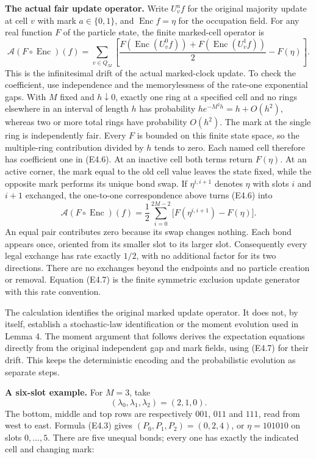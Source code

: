 \documentclass[
  11pt,
  a4paper,
]{article}
\begin{document}
\textbf{The actual fair update operator.} Write \(U_v^a f\) for the
original majority update at cell \(v\) with mark \(a\in\{0,1\}\), and
\(\operatorname{Enc}f=\eta\) for the occupation field. For any real
function \(F\) of the particle state, the finite marked-cell operator is
\[
\mathcal A(F\circ\operatorname{Enc})(f)
=\sum_{v\in Q_M}\left[
\frac{F(\operatorname{Enc}(U_v^0 f))+F(\operatorname{Enc}(U_v^1 f))}{2}
-F(\eta)\right].
\tag{E4.6}
\] This is the infinitesimal drift of the actual marked-clock update. To
check the coefficient, use independence and the memorylessness of the
rate-one exponential gaps. With \(M\) fixed and \(h\downarrow0\),
exactly one ring at a specified cell and no rings elsewhere in an
interval of length \(h\) has probability \(he^{-M^2h}=h+O(h^2)\),
whereas two or more total rings have probability \(O(h^2)\). The mark at
the single ring is independently fair. Every \(F\) is bounded on this
finite state space, so the multiple-ring contribution divided by \(h\)
tends to zero. Each named cell therefore has coefficient one in (E4.6).
At an inactive cell both terms return \(F(\eta)\). At an active corner,
the mark equal to the old cell value leaves the state fixed, while the
opposite mark performs its unique bond swap. If \(\eta^{i,i+1}\) denotes
\(\eta\) with slots \(i\) and \(i+1\) exchanged, the one-to-one
correspondence above turns (E4.6) into \[
\boxed{\quad
\mathcal A(F\circ\operatorname{Enc})(f)
=\frac12\sum_{i=0}^{2M-2}
\bigl[F(\eta^{i,i+1})-F(\eta)\bigr].\quad}
\tag{E4.7}
\] An equal pair contributes zero because its swap changes nothing. Each
bond appears once, oriented from its smaller slot to its larger slot.
Consequently every legal exchange has rate exactly \(1/2\), with no
additional factor for its two directions. There are no exchanges beyond
the endpoints and no particle creation or removal. Equation (E4.7) is
the finite symmetric exclusion update generator with this rate
convention.

The calculation identifies the original marked update operator. It does
not, by itself, establish a stochastic-law identification or the moment
evolution used in Lemma 4. The moment argument that follows derives the
expectation equations directly from the original independent gap and
mark fields, using (E4.7) for their drift. This keeps the deterministic
encoding and the probabilistic evolution as separate steps.

\textbf{A six-slot example.} For \(M=3\), take \[
(\lambda_0,\lambda_1,\lambda_2)=(2,1,0).
\] The bottom, middle and top rows are respectively \(001\), \(011\) and
\(111\), read from west to east. Formula (E4.3) gives
\((P_0,P_1,P_2)=(0,2,4)\), or \(\eta=101010\) on slots \(0,\ldots,5\).
There are five unequal bonds; every one has exactly the indicated cell
and changing mark:
\end{document}
